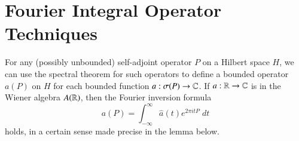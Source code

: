 %
%
%
%
%


\section{Fourier Integral Operator Techniques} \label{sec:FourierIntegral}

For any (possibly unbounded) self-adjoint operator $P$ on a Hilbert space $H$, we can use the spectral theorem for such operators to define a bounded operator $a(P)$ on $H$ for each bounded function $a: \sigma(P) \to \operatorname{\mathbb{C}}$. If $a: \operatorname{\mathbb{R}} \to \operatorname{\mathbb{C}}$ is in the Wiener algebra $A(\operatorname{\mathbb{R}})$, then the Fourier inversion formula
%
\begin{equation}
  a(P) = \int_{-\infty}^\infty \widehat{a}(t) e^{2 \pi i t P}\; dt
\end{equation}
%
holds, in a certain sense made precise in the lemma below.

